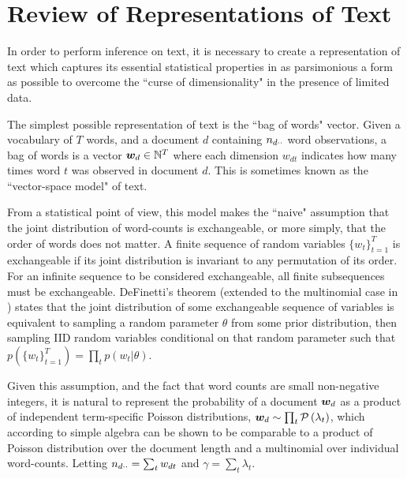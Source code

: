 

\section{Review of Representations of Text}

In order to perform inference on text, it is necessary to create a representation of text which captures its essential statistical properties in as parsimonious a form as possible to overcome the ``curse of dimensionality"\cite{Bishop2006} in the presence of limited data.

The simplest possible representation of text is the ``bag of words" vector. Given a vocabulary of $T$ words, and a document $d$ containing ${ n_{d\cdot\cdot} }$ word observations, a bag of words is a vector $\bm w_d \in { \mathbb{N}^{T} }$ where each dimension $w_{dt}$ indicates how many times word $t$ was observed in document $d$. This is sometimes known as the ``vector-space model"\cite{Jst2004} of text. 

From a statistical point of view, this model makes the ``naive" assumption that the joint distribution of word-counts is exchangeable, or more simply, that the order of words does not matter. A finite sequence of random variables $\{w_t\}_{t=1}^{T}$ is exchangeable if its joint distribution is invariant to any permutation of its order. For an infinite sequence to be considered exchangeable, all finite subsequences must be exchangeable. DeFinetti's theorem (extended to the multinomial case in \cite{Hewitt1955}) states that the joint distribution of some exchangeable sequence of variables is equivalent to sampling a random parameter $\theta$ from some prior distribution, then sampling IID random variables conditional on that random parameter such that $p\left(\{w_t\}_{t=1}^{T}\right) = \prod_t p(w_t | \theta)$.

Given this assumption, and the fact that word counts are small non-negative integers, it is natural to represent the probability of a document ${ \bm w_d }$ as a product of independent term-specific Poisson distributions, ${ \bm w_d } \sim \prod_t \mathcal{P} \left( {\lambda_t} \right)$, which according to simple algebra can be shown to be comparable to a product of Poisson distribution over the document length and a multinomial over individual word-counts. Letting ${ n_{d\cdot\cdot} } = \sum_t { w_{dt} }$ and $\gamma = \sum_t \lambda_t$.

